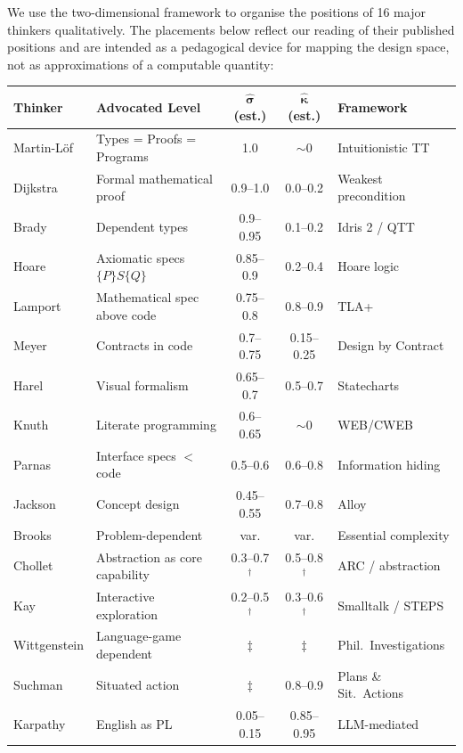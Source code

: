 \documentclass[11pt, a4paper, logo, copyright]{googledeepmind}
\begin{document}
We use the two-dimensional framework to organise the positions of 16 major thinkers qualitatively. The placements below reflect our reading of their published positions and are intended as a pedagogical device for mapping the design space, not as approximations of a computable quantity:

\begin{table}[H]
\centering
\small
\begin{tabular}{llccl}
\toprule
\textbf{Thinker} & \textbf{Advocated Level} & $\boldsymbol{\hat{\sigma}}$ \textbf{(est.)} & $\boldsymbol{\hat{\kappa}}$ \textbf{(est.)} & \textbf{Framework} \\
\midrule
Martin-L\"{o}f & Types = Proofs = Programs & 1.0 & $\sim$0 & Intuitionistic TT \\
Dijkstra & Formal mathematical proof & 0.9--1.0 & 0.0--0.2 & Weakest precondition \\
Brady & Dependent types & 0.9--0.95 & 0.1--0.2 & Idris 2 / QTT \\
Hoare & Axiomatic specs $\{P\}S\{Q\}$ & 0.85--0.9 & 0.2--0.4 & Hoare logic \\
Lamport & Mathematical spec above code & 0.75--0.8 & 0.8--0.9 & TLA+ \\
Meyer & Contracts in code & 0.7--0.75 & 0.15--0.25 & Design by Contract \\
Harel & Visual formalism & 0.65--0.7 & 0.5--0.7 & Statecharts \\
Knuth & Literate programming & 0.6--0.65 & $\sim$0 & WEB/CWEB \\
Parnas & Interface specs $<$ code & 0.5--0.6 & 0.6--0.8 & Information hiding \\
Jackson & Concept design & 0.45--0.55 & 0.7--0.8 & Alloy \\
Brooks & Problem-dependent & var. & var. & Essential complexity \\
Chollet & Abstraction as core capability & 0.3--0.7$^\dagger$ & 0.5--0.8$^\dagger$ & ARC / abstraction \\
Kay & Interactive exploration & 0.2--0.5$^\dagger$ & 0.3--0.6$^\dagger$ & Smalltalk / STEPS \\
Wittgenstein & Language-game dependent & $\ddagger$ & $\ddagger$ & Phil.\ Investigations \\
Suchman & Situated action & $\ddagger$ & 0.8--0.9 & Plans \& Sit.\ Actions \\
Karpathy & English as PL & 0.05--0.15 & 0.85--0.95 & LLM-mediated \\
\bottomrule
\end{tabular}

\end{table}
\end{document}

